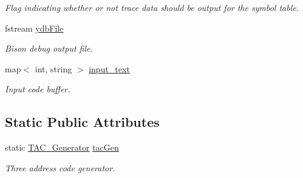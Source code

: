 \begin{DoxyCompactItemize}
\begin{DoxyCompactList}\small\item\em Flag indicating whether or not trace data should be output for the symbol table. \end{DoxyCompactList}\item 
\hypertarget{classCCompiler_aa185f3a3e7345798eecf9e4cbfb6be1a}{fstream \hyperlink{classCCompiler_aa185f3a3e7345798eecf9e4cbfb6be1a}{ydb\-File}}\label{classCCompiler_aa185f3a3e7345798eecf9e4cbfb6be1a}

\begin{DoxyCompactList}\small\item\em Bison debug output file. \end{DoxyCompactList}\item 
\hypertarget{classCCompiler_a8898bce76cc8cce6e1eb516f1b09328d}{map$<$ int, string $>$ \hyperlink{classCCompiler_a8898bce76cc8cce6e1eb516f1b09328d}{input\-\_\-text}}\label{classCCompiler_a8898bce76cc8cce6e1eb516f1b09328d}

\begin{DoxyCompactList}\small\item\em Input code buffer. \end{DoxyCompactList}\end{DoxyCompactItemize}
\subsection*{Static Public Attributes}
\begin{DoxyCompactItemize}
\item 
\hypertarget{classCCompiler_ad8fe69bbb8afffda34ca69325af7ff0b}{static \hyperlink{classTAC__Generator}{T\-A\-C\-\_\-\-Generator} \hyperlink{classCCompiler_ad8fe69bbb8afffda34ca69325af7ff0b}{tac\-Gen}}\label{classCCompiler_ad8fe69bbb8afffda34ca69325af7ff0b}

\begin{DoxyCompactList}\small\item\em Three address code generator. \end{DoxyCompactList}\end{DoxyCompactItemize}
